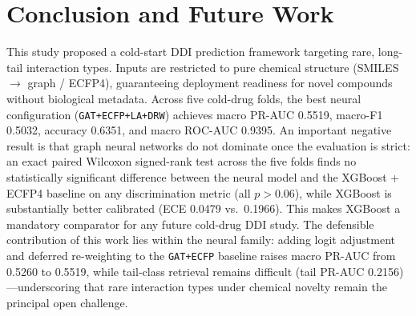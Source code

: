 \documentclass[11pt,a4paper,twocolumn]{article}
\begin{document}
\section{Conclusion and Future Work}

This study proposed a cold-start DDI prediction framework targeting rare,
long-tail interaction types.
Inputs are restricted to pure chemical structure (SMILES $\to$ graph / ECFP4),
guaranteeing deployment readiness for novel compounds without biological metadata.
Across five cold-drug folds, the best neural configuration (\texttt{GAT+ECFP+LA+DRW})
achieves macro PR-AUC 0.5519, macro-F1 0.5032, accuracy 0.6351, and macro
ROC-AUC 0.9395.
An important negative result is that graph neural networks do not dominate
once the evaluation is strict: an exact paired Wilcoxon signed-rank test
across the five folds finds no statistically significant difference between
the neural model and the XGBoost + ECFP4 baseline on any discrimination
metric (all $p > 0.06$), while XGBoost is substantially better calibrated
(ECE 0.0479 vs.\ 0.1966).
This makes XGBoost a mandatory comparator for any future cold-drug DDI study.
The defensible contribution of this work lies within the neural family:
adding logit adjustment and deferred re-weighting to the \texttt{GAT+ECFP}
baseline raises macro PR-AUC from 0.5260 to 0.5519, while tail-class
retrieval remains difficult (tail PR-AUC 0.2156)---underscoring that
rare interaction types under chemical novelty remain the principal
open challenge.
\end{document}
